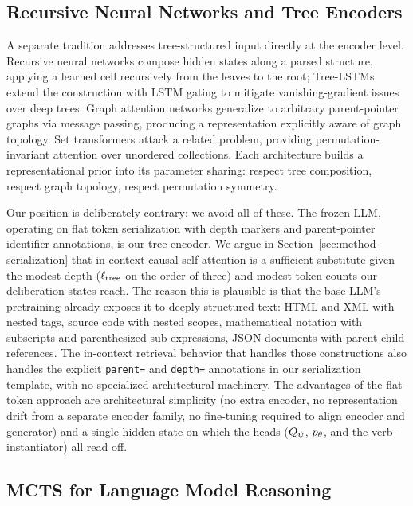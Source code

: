 \subsection{Recursive Neural Networks and Tree Encoders}
\label{sec:rw-trees}

A separate tradition addresses tree-structured input directly at the
encoder level. Recursive neural networks \citep{socher2013recursive}
compose hidden states along a parsed structure, applying a learned cell
recursively from the leaves to the root; Tree-LSTMs
\citep{tai2015improved} extend the construction with LSTM gating to
mitigate vanishing-gradient issues over deep trees. Graph attention
networks \citep{velickovic2018gat} generalize to arbitrary
parent-pointer graphs via message passing, producing a representation
explicitly aware of graph topology. Set transformers
\citep{lee2019set} attack a related problem, providing
permutation-invariant attention over unordered collections. Each
architecture builds a representational prior into its parameter
sharing: respect tree composition, respect graph topology, respect
permutation symmetry.

Our position is deliberately contrary: we avoid all of these. The
frozen LLM, operating on flat token serialization with depth markers
and parent-pointer identifier annotations, is our tree encoder. We
argue in Section~\ref{sec:method-serialization} that in-context causal
self-attention is a sufficient substitute given the modest depth
($\ell_{\mathrm{tree}}$ on the order of three) and modest token counts our
deliberation states reach. The reason this is plausible is that the
base LLM's pretraining already exposes it to deeply structured text:
HTML and XML with nested tags, source code with nested scopes,
mathematical notation with subscripts and parenthesized sub-expressions,
JSON documents with parent-child references. The in-context retrieval
behavior that handles those constructions also handles the explicit
\texttt{parent=} and \texttt{depth=} annotations in our serialization
template, with no specialized architectural machinery. The advantages of
the flat-token approach are architectural simplicity (no extra encoder,
no representation drift from a separate encoder family, no fine-tuning
required to align encoder and generator) and a single hidden state on
which the heads ($Q_{\psi}$, $p_{\theta}$, and the verb-instantiator) all read
off.

\subsection{MCTS for Language Model Reasoning}
\label{sec:rw-mcts-llm}

